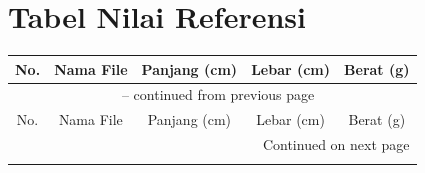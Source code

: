 \chapter{Tabel Nilai Referensi}

\begin{longtable}{|c|c|c|c|c|}
       \hline
        No. & Nama File & Panjang (cm) & Lebar (cm) & Berat (g) \\
        \hline
        \endfirsthead
        \multicolumn{5}{c}{{\tablename\ \thetable{} -- continued from previous page}} \\
        \hline
        No. & Nama File & Panjang (cm) & Lebar (cm) & Berat (g) \\
        \hline
        \endhead
        \hline \multicolumn{5}{|r|}{{Continued on next page}} \\ \hline
        \endfoot
        \hline
        \endlastfoot



\end{longtable}
